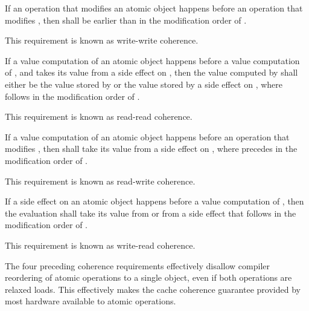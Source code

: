 \pnum
{}%
If an operation  that modifies an atomic object  happens before
an operation  that modifies , then  shall be earlier
than  in the modification order of . \begin{note} This requirement
is known as write-write coherence. \end{note}

\pnum
{}%
If a
%
value computation  of an atomic object  happens before a
value computation  of , and  takes its value from a side
effect  on , then the value computed by  shall either be
the value stored by  or the value stored by a
%
side effect  on
, where  follows  in the modification order of .
\begin{note} This requirement is known as read-read coherence. \end{note}

\pnum
{}%
If a
%
value computation  of an atomic object  happens before an
operation  that modifies , then  shall take its value from a side
effect  on , where  precedes  in the
modification order of . \begin{note} This requirement is known as
read-write coherence. \end{note}

\pnum
{}%
If a
%
side effect  on an atomic object  happens before a value
computation  of , then the evaluation  shall take its
value from  or from a
%
side effect  that follows  in the
modification order of . \begin{note} This requirement is known as
write-read coherence. \end{note}

\pnum
\begin{note} The four preceding coherence requirements effectively disallow
compiler reordering of atomic operations to a single object, even if both
operations are relaxed loads. This effectively makes the cache coherence
guarantee provided by most hardware available to \Cpp{} atomic operations.
\end{note}

